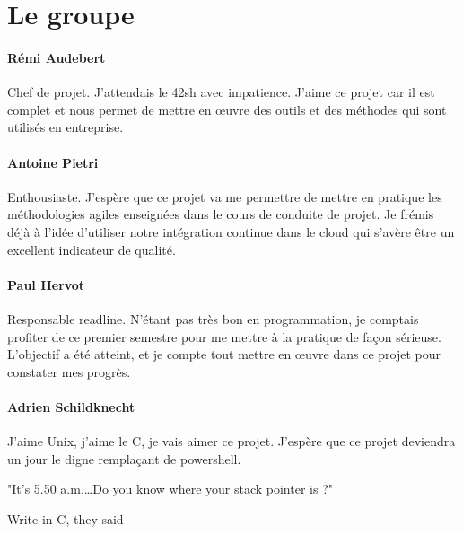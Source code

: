 \section{Le groupe}

\paragraph{Rémi Audebert} Chef de projet. J'attendais le 42sh avec impatience.
J'aime ce projet car il est complet et nous permet de mettre en œuvre des
outils et des méthodes qui sont utilisés en entreprise.

\paragraph{Antoine Pietri} Enthousiaste. J'espère que ce projet va me permettre
de mettre en pratique les méthodologies agiles enseignées dans le cours de
conduite de projet. Je frémis déjà à l'idée d'utiliser notre intégration
continue dans le cloud qui s'avère être un excellent indicateur de qualité.

\paragraph{Paul Hervot} Responsable readline. N'étant pas très bon en
programmation, je comptais profiter de ce premier semestre pour me mettre à la
pratique de façon sérieuse. L'objectif a été atteint, et je compte tout mettre
en œuvre dans ce projet pour constater mes progrès.

\paragraph{Adrien Schildknecht} J'aime Unix, j'aime le C, je vais aimer ce
projet. J'espère que ce projet deviendra un jour le digne remplaçant de
powershell.

\epigraph{
         "It's 5.50 a.m.\ldots Do you know where your stack pointer is ?"
}{Write in C, they said}

